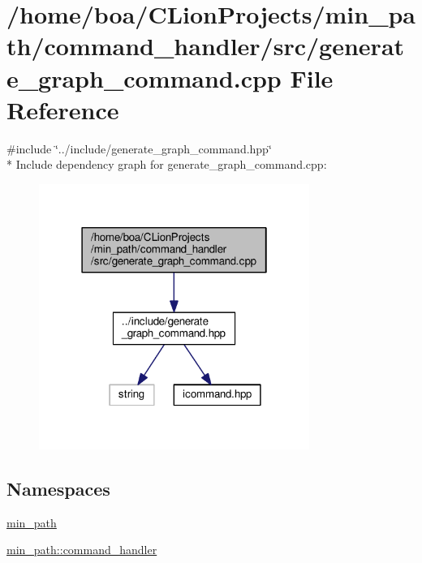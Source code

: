 \hypertarget{a00025}{}\section{/home/boa/\+C\+Lion\+Projects/min\+\_\+path/command\+\_\+handler/src/generate\+\_\+graph\+\_\+command.cpp File Reference}
\label{a00025}
{\ttfamily \#include \char`\"{}../include/generate\+\_\+graph\+\_\+command.\+hpp\char`\"{}}\\*
Include dependency graph for generate\+\_\+graph\+\_\+command.\+cpp\+:
\nopagebreak
\begin{figure}[H]
\begin{center}
\leavevmode
\includegraphics[width=250pt]{d9/d2e/a00056}
\end{center}
\end{figure}
\subsection*{Namespaces}
\begin{DoxyCompactItemize}
\item 
 \hyperlink{a00033}{min\+\_\+path}
\item 
 \hyperlink{a00035}{min\+\_\+path\+::command\+\_\+handler}
\end{DoxyCompactItemize}
